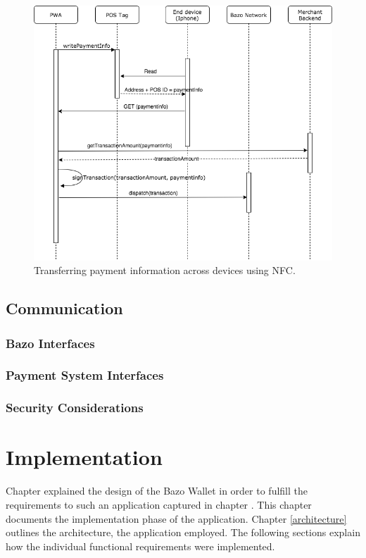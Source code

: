 \begin{figure}
\centering
\includegraphics[width=1\textwidth]{diagrams/POS_flow.png}
\caption{\label{fig:POS}Transferring payment information across devices using NFC.}
\end{figure}

\section{Communication}
\subsection{Bazo Interfaces}
\subsection{Payment System Interfaces}

\subsection{Security Considerations}







\chapter{Implementation}
Chapter \cite{undefined} explained the design of the Bazo Wallet in order to fulfill the requirements to such an application captured in chapter \cite{undefined}. This chapter documents the implementation phase of the application. Chapter  \ref{architecture} outlines the architecture, the application employed. The following sections explain how the individual functional requirements were implemented.
